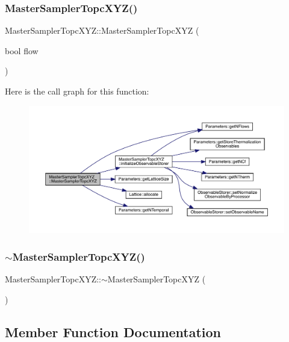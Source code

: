 \subsubsection{\texorpdfstring{MasterSamplerTopcXYZ()}{MasterSamplerTopcXYZ()}}
{\footnotesize\ttfamily Master\+Sampler\+Topc\+X\+Y\+Z\+::\+Master\+Sampler\+Topc\+X\+YZ (\begin{DoxyParamCaption}\item[{bool}]{flow }\end{DoxyParamCaption})}

Here is the call graph for this function\+:
\nopagebreak
\begin{figure}[H]
\begin{center}
\leavevmode
\includegraphics[width=350pt]{class_master_sampler_topc_x_y_z_ad8ba8f2c50c66d823c551f71fd62a99b_cgraph}
\end{center}
\end{figure}
\mbox{\label{class_master_sampler_topc_x_y_z_a7e896952c909a1f29f97e0ef4c52d348}} 
\subsubsection{\texorpdfstring{$\sim$MasterSamplerTopcXYZ()}{~MasterSamplerTopcXYZ()}}
{\footnotesize\ttfamily Master\+Sampler\+Topc\+X\+Y\+Z\+::$\sim$\+Master\+Sampler\+Topc\+X\+YZ (\begin{DoxyParamCaption}{ }\end{DoxyParamCaption})}



\subsection{Member Function Documentation}
\mbox{\label{class_master_sampler_topc_x_y_z_a0ea80ad9935db791f00461b7dfd548b7}} 
